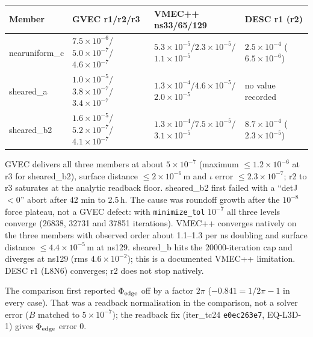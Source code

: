 \begin{center}\small
\begin{tabular}{p{20mm}p{34mm}p{34mm}p{34mm}}
\toprule
Member & GVEC r1/r2/r3 & VMEC++ ns33/65/129 & DESC r1 (r2) \\
\midrule
nearuniform\_c & $7.5\times10^{-6}$/$5.0\times10^{-7}$/$4.6\times10^{-7}$ &
$5.3\times10^{-5}$/$2.3\times10^{-5}$/$1.1\times10^{-5}$ & $2.5\times10^{-4}$ ($6.5\times10^{-6}$) \\
sheared\_a & $1.0\times10^{-5}$/$3.8\times10^{-7}$/$3.4\times10^{-7}$ &
$1.3\times10^{-4}$/$4.6\times10^{-5}$/$2.0\times10^{-5}$ & no value recorded \\
sheared\_b2 & $1.6\times10^{-5}$/$5.2\times10^{-7}$/$4.1\times10^{-7}$ &
$1.3\times10^{-4}$/$7.5\times10^{-5}$/$3.1\times10^{-5}$ & $8.7\times10^{-4}$ ($2.3\times10^{-5}$) \\
\bottomrule
\end{tabular}
\end{center}

GVEC delivers all three members at about $5\times10^{-7}$ (maximum $\le1.2\times10^{-6}$ at
r3 for sheared\_b2), surface distance $\le2\times10^{-6}$\,m and $\iota$ error $\le2.3\times10^{-7}$; r2 to r3 saturates at
the analytic readback floor. sheared\_b2 first failed with a ``detJ$<$0'' abort after
42 min to 2.5\,h. The cause was roundoff growth after the $10^{-8}$ force plateau, not a
GVEC defect: with \texttt{minimize\_tol} $10^{-7}$ all three levels converge (26838, 32731
and 37851 iterations). VMEC++ converges natively on the three members with observed order
about 1.1--1.3 per ns doubling and surface distance $\le4.4\times10^{-5}$\,m at ns129.
sheared\_b hits the 20000-iteration cap and diverges at ns129 (rms $4.6\times10^{-2}$);
this is a documented VMEC++ limitation. DESC r1 (L8N6) converges; r2 does not stop natively.

The comparison first reported $\Phi_{\rm edge}$ off by a factor $2\pi$
($-0.841=1/2\pi-1$ in every case). That was a readback normalisation in the comparison,
not a solver error ($B$ matched to $5\times10^{-7}$); the readback fix (iter\_tc24
\texttt{e0ec263e7}, EQ-L3D-1) gives $\Phi_{\rm edge}$ error 0.
